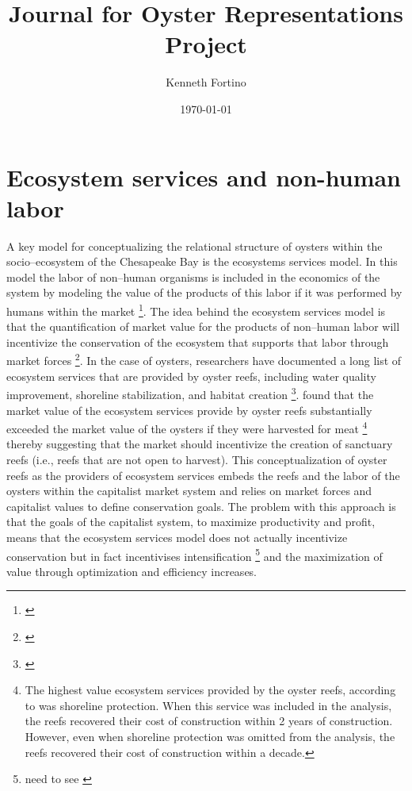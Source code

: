 \documentclass{article}
\begin{document}
\title{Journal for Oyster Representations Project}
\author{Kenneth Fortino}
\date{\today}

\maketitle

\section{Ecosystem services and non-human labor}

A key model for conceptualizing the relational structure of oysters within the socio--ecosystem of the Chesapeake Bay is the ecosystems services model. In this model the labor of non--human organisms is included in the economics of the system by modeling the value of the products of this labor if it was performed by humans within the market \footnote{\cite{costanza_value_1998}}. The idea behind the ecosystem services model is that the quantification of market value for the products of non--human labor will incentivize the conservation of the ecosystem that supports that labor  through market forces \footnote{\cite{costanza_value_1998}}. In the case of oysters, researchers have documented a long list of ecosystem services that are provided by oyster reefs, including water quality improvement, shoreline stabilization, and habitat creation \footnote{\cite{grabowski_economic_2012, coen_oyster_date}}. \citet{grabowski_economic_2012} found that the market value of the ecosystem services provide by oyster reefs substantially exceeded the market value of the oysters if they were harvested for meat 
\footnote{The highest value ecosystem services  provided by the oyster reefs, according to \cite{grabowski_economic_2012} was shoreline protection. When this service was included in the analysis, the reefs recovered their cost of construction within 2 years of construction. However, even when shoreline protection was omitted from the analysis, the reefs recovered their cost of construction within a decade.} 
thereby suggesting that the market should incentivize the creation of sanctuary reefs (i.e., reefs that are not open to harvest). This conceptualization of oyster reefs as the providers of ecosystem services embeds the reefs and the labor of the oysters within the capitalist market system and relies on market forces and capitalist values to define conservation goals. The problem with this approach is that the goals of the capitalist system, to maximize productivity and profit, means that the ecosystem services model does not actually incentivize conservation but in fact incentivises intensification \footnote{need to see \cite{bommarco_ecological_2013}} and the maximization of value through optimization and efficiency increases. 
\end{document}
